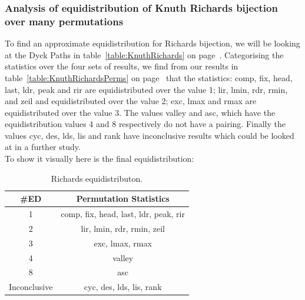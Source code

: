 \documentclass[12pt]{article}
\begin{document}
\subsubsection{Analysis of equidistribution of Knuth Richards bijection over many permutations}
To find an approximate equidistribution for Richards bijection, we will be looking at the Dyck Paths in table~\ref{table:KnuthRichards} on page~\pageref{table:KnuthRichards}. Categorising the statistics over the four sets of results, we find from our results in table~\ref{table:KnuthRichardsPerms} on page~\pageref{table:KnuthRichardsPerms} that the statistics: comp, fix, head, last, ldr, peak and rir are equidistributed over the value 1; lir, lmin, rdr, rmin, and zeil and equidistributed over the value 2; exc, lmax and rmax are equidistributed over the value 3. The values valley and asc, which have the equidistribution values 4 and 8 respectively do not have a pairing. Finally the values cyc, des, lds, lis and rank have inconclusive results which could be looked at in a further study.\\
To show it visually here is the final equidistribution:
\begin{table}[H]
\caption{Richards equidistributon.}
\begin{tabular}{c | c }
\hline\hline
\#ED & Permutation Statistics\\ [0.5ex]
\hline
1 & comp, fix, head, last, ldr, peak, rir\\
\hline
2 & lir, lmin, rdr, rmin, zeil\\
\hline
3 & exc, lmax, rmax\\
\hline
4 & valley\\
\hline
8 & asc\\
\hline
Inconclusive & cyc, des, lds, lis, rank\\
\hline
\end{tabular}
\label{table:FinalEDKnuthRichards}
\end{table}

\newpage



\newpage
\end{document}
